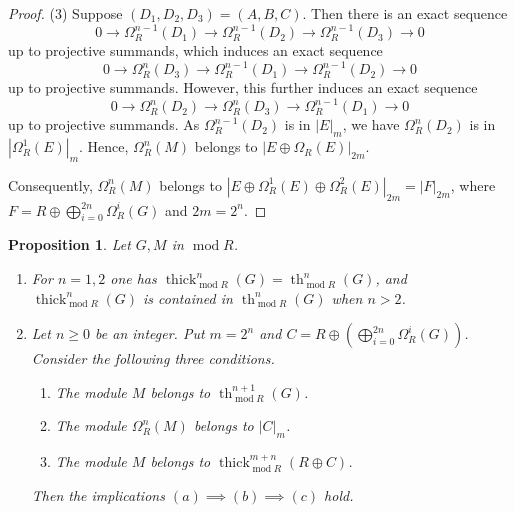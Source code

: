 \documentclass[11pt]{amsart}
\theoremstyle{plain}
\newtheorem{proposition}[theorem]{Proposition}
\theoremstyle{definition}
\numberwithin{equation}{section}
\numberwithin{theorem}{section}
\begin{document}
\begin{proof}
    (3) Suppose $(D_1,D_2,D_3)=(A,B,C)$. Then there is an exact sequence
    \begin{displaymath}
        0 \to \Omega_R^{n-1} (D_1) \to \Omega_R^{n-1} (D_2) \to \Omega_R^{n-1} (D_3) \to 0
    \end{displaymath}
    up to projective summands, which induces an exact sequence
    \begin{displaymath}
        0 \to \Omega_R^n (D_3) \to \Omega_R^{n-1} (D_1) \to \Omega_R^{n-1} (D_2) \to 0
    \end{displaymath}
    up to projective summands. However, this further induces an exact sequence
    \begin{displaymath}
        0 \to \Omega_R^n (D_2) \to \Omega_R^n (D_3) \to \Omega_R^{n-1} (D_1) \to 0
    \end{displaymath}
    up to projective summands. As $\Omega_R^{n-1} (D_2)$ is in $|E|_m$, we have
    $\Omega_R^n (D_2)$ is in $|\Omega_R^1 (E)|_m$. Hence, $\Omega_R^n (M)$ belongs to $|E\oplus\Omega_R (E)|_{2m}$.

    Consequently, $\Omega_R^n (M)$ belongs to $|E\oplus\Omega_R^1
    (E)\oplus\Omega_R^2(E)|_{2m}=|F|_{2m}$, where $F=R\oplus\bigoplus_{i=0}^{2n}\Omega_R^i (G)$ and $2m=2^n$.
\end{proof}

\begin{proposition}\label{prop:large_thickening_to_syzygy}
    Let $G,M$ in $ \operatorname{mod}R$.
    \begin{enumerate}
        \item For $n=1,2$ one has $\operatorname{thick}_{\operatorname{mod}R}^n (G)=\operatorname{th}_{\operatorname{mod}R}^n (G)$, and $\operatorname{thick}_{\operatorname{mod}R}^n (G) $ is contained in $ \operatorname{th}_{\operatorname{mod}R}^n (G)$ when $n>2$.
        \item Let $n\geq 0$ be an integer. Put $m=2^n$ and $C=R\oplus(\bigoplus_{i=0}^{2n}\Omega_R^i (G))$. Consider the following three conditions.
        \begin{enumerate}
            \item The module $M$ belongs to $\operatorname{th}_{\operatorname{mod}R}^{n+1} (G)$.
            \item The module $\Omega_R^n (M)$ belongs to $|C|_m$.
            \item The module $M$ belongs to $\operatorname{thick}^{m+n}_{\operatorname{mod}R}(R\oplus C)$.
        \end{enumerate}
        Then the implications $(a) \implies (b) \implies (c)$ hold.
    \end{enumerate}
\end{proposition}
\end{document}
